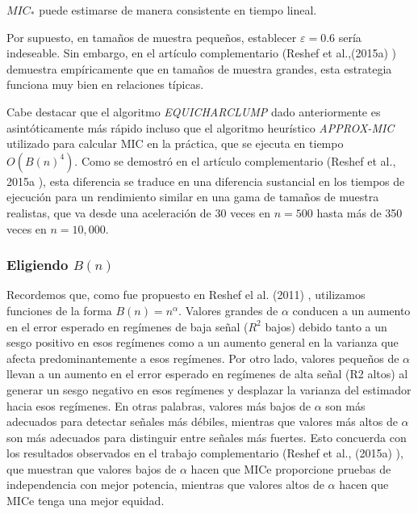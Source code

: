         \begin{cor}
            $ M I C_*$ puede estimarse de manera consistente en tiempo lineal. 
        \end{cor}

        Por supuesto, en tama\~nos de muestra peque\~nos, establecer $\varepsilon=0.6$ ser\'ia indeseable. Sin embargo, en el art\'iculo complementario (Reshef et al.,(2015a) \cite{Reshef2015a}) demuestra emp\'iricamente que en tama\~nos de muestra grandes, esta estrategia funciona muy bien en relaciones t\'ipicas.

        Cabe destacar que el algoritmo \textit{EQUICHARCLUMP} dado anteriormente es asint\'oticamente m\'as r\'apido incluso que el algoritmo heur\'istico \textit{APPROX-MIC} utilizado para calcular MIC en la pr\'actica, que se ejecuta en tiempo $O\left(B(n)^4\right)$. Como se demostr\'o en el art\'iculo complementario (Reshef et al., 2015a \cite{Reshef2016}), esta diferencia se traduce en una diferencia sustancial en los tiempos de ejecuci\'on para un rendimiento similar en una gama de tama\~nos de muestra realistas, que va desde una aceleraci\'on de 30 veces en $n=500$ hasta m\'as de 350 veces en $n=10,000$.
    
    
        \subsubsection[eligiendoBn]{Eligiendo $B(n)$}\label{eligiendo_Bn}
            
        Recordemos que, como fue propuesto en Reshef el al. (2011) \cite{Reshef2011}, utilizamos funciones de la forma $B(n)=n^\alpha$. Valores grandes de $\alpha$ conducen a un aumento en el error esperado en reg\'imenes de baja se\~nal ($R^2$ bajos) debido tanto a un sesgo positivo en esos reg\'imenes como a un aumento general en la varianza que afecta predominantemente a esos reg\'imenes. Por otro lado, valores peque\~nos de $\alpha$ llevan a un aumento en el error esperado en reg\'imenes de alta se\~nal (R2 altos) al generar un sesgo negativo en esos reg\'imenes y desplazar la varianza del estimador hacia esos reg\'imenes. En otras palabras, valores m\'as bajos de $\alpha$ son m\'as adecuados para detectar se\~nales m\'as d\'ebiles, mientras que valores m\'as altos de $\alpha$ son m\'as adecuados para distinguir entre se\~nales m\'as fuertes. Esto concuerda con los resultados observados en el trabajo complementario (Reshef et al., (2015a) \cite{Reshef2015a} ), que muestran que valores bajos de $\alpha$ hacen que MICe proporcione pruebas de independencia con mejor potencia, mientras que valores altos de $\alpha$ hacen que MICe tenga una mejor equidad.
    
